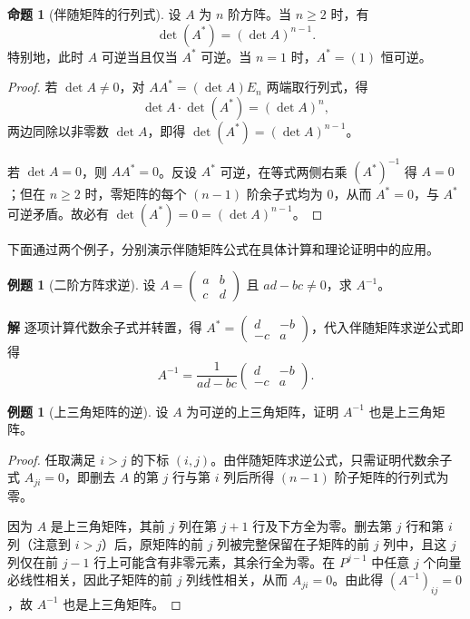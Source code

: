 \documentclass[UTF8, fontset=fandol, a4paper, 12pt]{ctexart}
\theoremstyle{definition}
\newtheorem{proposition}[definition]{命题}
\newtheorem{example}[definition]{例题}
\begin{document}
\begin{proposition}[伴随矩阵的行列式]
设 $A$ 为 $n$ 阶方阵。当 $n\ge2$ 时，有
\[
 \det(A^*)=(\det A)^{n-1}.
\]
特别地，此时 $A$ 可逆当且仅当 $A^*$ 可逆。当 $n=1$ 时，$A^*=(1)$ 恒可逆。
\end{proposition}
\begin{proof}
若 $\det A\ne0$，对 $AA^*=(\det A)E_n$ 两端取行列式，得
\[
 \det A\cdot\det(A^*)=(\det A)^n,
\]
两边同除以非零数 $\det A$，即得 $\det(A^*)=(\det A)^{n-1}$。

若 $\det A=0$，则 $AA^*=0$。反设 $A^*$ 可逆，在等式两侧右乘 $(A^*)^{-1}$ 得 $A=0$；但在 $n\ge2$ 时，零矩阵的每个 $(n-1)$ 阶余子式均为 $0$，从而 $A^*=0$，与 $A^*$ 可逆矛盾。故必有 $\det(A^*)=0=(\det A)^{n-1}$。
\end{proof}

下面通过两个例子，分别演示伴随矩阵公式在具体计算和理论证明中的应用。

\begin{example}[二阶方阵求逆]\label{ex:inverse-two}
设 $A=\begin{pmatrix}a&b\\c&d\end{pmatrix}$ 且 $ad-bc\ne0$，求 $A^{-1}$。
\end{example}
\noindent\textbf{解}\quad
逐项计算代数余子式并转置，得 $A^*=\begin{pmatrix}d&-b\\-c&a\end{pmatrix}$，代入伴随矩阵求逆公式即得
\[
 A^{-1}=\frac{1}{ad-bc}\begin{pmatrix}d&-b\\-c&a\end{pmatrix}.
\]

\begin{example}[上三角矩阵的逆]
设 $A$ 为可逆的上三角矩阵，证明 $A^{-1}$ 也是上三角矩阵。
\end{example}
\begin{proof}
任取满足 $i>j$ 的下标 $(i,j)$。由伴随矩阵求逆公式，只需证明代数余子式 $A_{ji}=0$，即删去 $A$ 的第 $j$ 行与第 $i$ 列后所得 $(n-1)$ 阶子矩阵的行列式为零。

因为 $A$ 是上三角矩阵，其前 $j$ 列在第 $j+1$ 行及下方全为零。删去第 $j$ 行和第 $i$ 列（注意到 $i>j$）后，原矩阵的前 $j$ 列被完整保留在子矩阵的前 $j$ 列中，且这 $j$ 列仅在前 $j-1$ 行上可能含有非零元素，其余行全为零。在 $P^{j-1}$ 中任意 $j$ 个向量必线性相关，因此子矩阵的前 $j$ 列线性相关，从而 $A_{ji}=0$。由此得 $(A^{-1})_{ij}=0$，故 $A^{-1}$ 也是上三角矩阵。
\end{proof}
\end{document}
